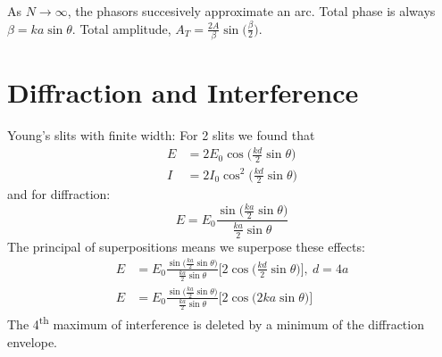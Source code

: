 \documentclass[a4paper, 11pt, normalem]{report}
\begin{document}
As $N \rightarrow \infty$, the phasors succesively approximate an arc.
Total phase is always $\beta = ka\sin{\theta}$.
Total amplitude, $A_{T} = \frac{2A}{\beta}\sin{\Big(\frac{\beta}{2}\Big)}$.

\section{Diffraction and Interference}
Young's slits with finite width:
For 2 slits we found that
\begin{align}
    E &= 2E_{0}\cos{\Big(\frac{kd}{2}\sin{\theta}\Big)} \\
    I &= 2I_{0}\cos^{2}{\Big(\frac{kd}{2}\sin{\theta}\Big)}
\end{align}
and for diffraction:
\begin{equation}
    E = E_{0}\frac{\sin{\big(\tfrac{ka}{2}\sin{\theta}\big)}}{\tfrac{ka}{2}\sin{\theta}}
\end{equation}
The principal of superpositions means we superpose these effects:
\begin{align}
    E &= E_{0}\frac{\sin{\big(\tfrac{ka}{2}\sin{\theta}\big)}}{\tfrac{ka}{2}\sin{\theta}}\Big[2\cos{\Big(\frac{kd}{2}\sin{\theta}\Big)}\Big],~d = 4a \\
    E &= E_{0}\frac{\sin{\big(\tfrac{ka}{2}\sin{\theta}\big)}}{\tfrac{ka}{2}\sin{\theta}}\Big[2\cos{\Big(2ka\sin{\theta}\Big)}\Big]
\end{align}
The 4\textsuperscript{th} maximum of interference is deleted by a minimum of the diffraction envelope.
\end{document}
